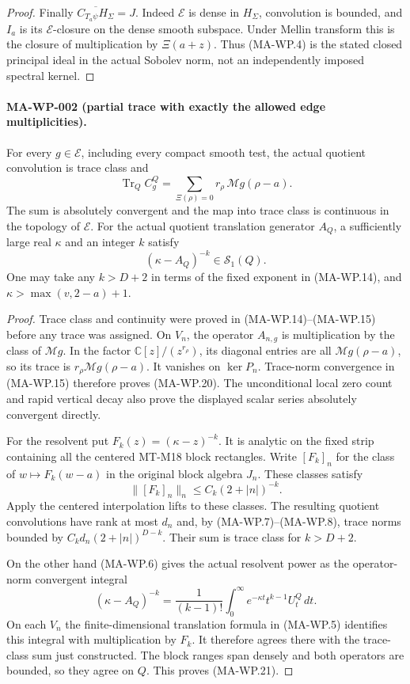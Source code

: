 \begin{proof}
Finally $\overline{C_{T_a\psi}H_\Sigma}=J$.
Indeed $\mathcal E$ is dense in $H_\Sigma$, convolution
is bounded, and $I_a$ is its $\mathcal E$-closure on the
dense smooth subspace. Under Mellin transform this is
the closure of multiplication by $\Xi(a+z)$.
Thus (MA-WP.4) is the stated closed principal ideal in
the actual Sobolev norm, not an independently imposed
spectral kernel.
\end{proof}

\paragraph{MA-WP-002 (partial trace with exactly the allowed edge multiplicities).}
For every $g\in\mathcal E$, including every compact smooth
test, the actual quotient convolution is trace class and
\[
        \operatorname{Tr}_Q C_g^Q
          =\sum_{\Xi(\rho)=0}r_\rho\,
                                  \mathcal Mg(\rho-a).
 \tag{MA-WP.20}
\]
The sum is absolutely convergent and the map into trace
class is continuous in the topology of $\mathcal E$.
For the actual quotient translation generator $A_Q$,
a sufficiently large real $\kappa$ and an integer $k$
satisfy
\[
                      (\kappa-A_Q)^{-k}\in\mathcal S_1(Q).
 \tag{MA-WP.21}
\]
One may take any $k>D+2$ in terms of the fixed exponent
in (MA-WP.14), and
$\kappa>\max(v,2-a)+1$.

\begin{proof}
Trace class and continuity were proved in (MA-WP.14)--(MA-WP.15)
before any trace was assigned. On $V_n$, the operator
$A_{n,g}$ is multiplication by the class of $\mathcal Mg$.
In the factor $\mathbb C[z]/(z^{r_\rho})$, its diagonal
entries are all $\mathcal Mg(\rho-a)$, so its trace is
$r_\rho\mathcal Mg(\rho-a)$. It vanishes on $\ker P_n$.
Trace-norm convergence in (MA-WP.15) therefore proves
(MA-WP.20). The unconditional local zero count and rapid
vertical decay also prove the displayed scalar series
absolutely convergent directly.

For the resolvent put $F_k(z)=(\kappa-z)^{-k}$.
It is analytic on the fixed strip containing all the
centered MT-M18 block rectangles. Write $[F_k]_n$ for
the class of $w\mapsto F_k(w-a)$ in the original
block algebra $J_n$. These classes satisfy
\[
             \|[F_k]_n\|_n\le C_k(2+|n|)^{-k}.
\]
Apply the centered interpolation lifts to these classes.
The resulting quotient convolutions have rank at most
$d_n$ and, by (MA-WP.7)--(MA-WP.8), trace norms bounded
by $C_kd_n(2+|n|)^{D-k}$. Their sum is trace class for
$k>D+2$.

On the other hand (MA-WP.6) gives the actual resolvent
power as the operator-norm convergent integral
\[
 (\kappa-A_Q)^{-k}
   =\frac1{(k-1)!}\int_0^\infty
              e^{-\kappa t}t^{k-1}U_t^Q\,dt.
 \tag{MA-WP.22}
\]
On each $V_n$ the finite-dimensional translation formula
in (MA-WP.5) identifies this integral with multiplication
by $F_k$. It therefore agrees there with the trace-class
sum just constructed. The block ranges span densely and
both operators are bounded, so they agree on $Q$.
This proves (MA-WP.21).
\end{proof}


